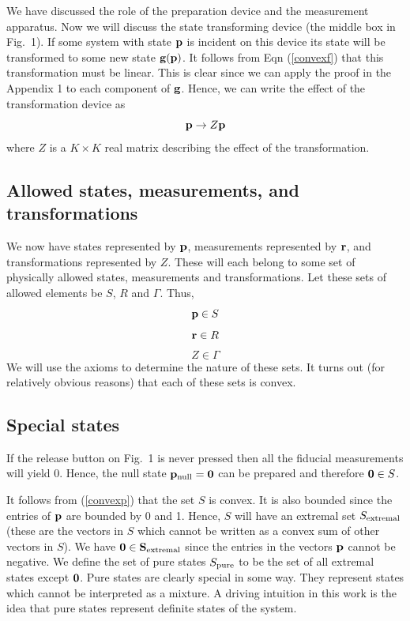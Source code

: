 \documentclass[12pt]{article}
\begin{document}
We have discussed the role of the preparation device and the measurement
apparatus.  Now we will discuss the state transforming device (the
middle box in Fig.\ 1). If some system with state ${\bf p}$ is incident on this
device its state will be transformed to some new state ${\bf g}({\bf p})$.  It
follows from Eqn (\ref{convexf}) that this transformation must be
linear.  This is clear since we can apply the proof in the Appendix 1 to
each component of ${\bf g}$.  Hence, we can write the effect of the
transformation device as
\begin{equation}
{\bf p} \rightarrow Z {\bf p}
\end{equation}
where $Z$ is a $K\times K$ real matrix describing the effect of the
transformation.

\subsection{Allowed states, measurements, and transformations}

We now have states represented by $\bf p$, measurements represented by
$\bf r$, and transformations represented by $Z$.
These will each belong to some set
of physically allowed states, measurements and transformations. Let these
sets of allowed elements be $S$, $R$ and $\Gamma$.  Thus,
\begin{equation}
{\bf p} \in S
\end{equation}
\begin{equation}
{\bf r} \in R
\end{equation}
\begin{equation}
Z \in \Gamma
\end{equation}
We will use the axioms to determine the nature of these sets. It
turns out (for relatively obvious reasons) that each of these sets is convex.

\subsection{Special states}\label{specialstates}

If the release button on Fig.\ 1 is never pressed then all the fiducial
measurements will yield 0.  Hence, the null state ${\bf p}_{\rm null}={\bf 0}$
can be prepared and therefore ${\bf 0}\in S$.

It follows from (\ref{convexp}) that the set $S$ is convex. It is also
bounded since the entries of ${\bf p}$ are bounded by 0 and 1. Hence,
$S$ will have an extremal set $S_{\rm extremal}$ (these are the vectors in $S$
which cannot be written as a convex sum of other vectors in $S$).
We have  $\bf 0\in S_{\rm extremal}$ since the entries in the vectors
$\bf p$ cannot be negative.  We define the set of pure states $S_{\rm
pure}$ to be the set of all extremal states except $\bf 0$.
Pure states are clearly special in some way. They represent states which
cannot be interpreted as a mixture.  A driving intuition in this work
is the idea that pure states represent definite states of the system.
\end{document}
